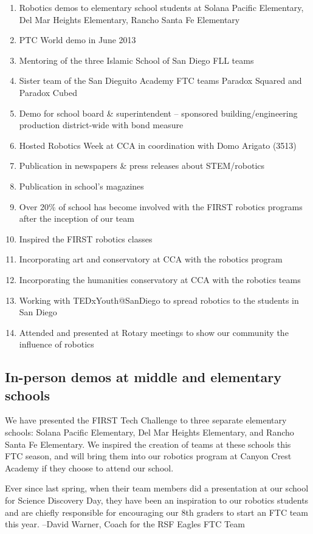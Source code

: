 \begin{enumerate}
	\item Robotics demos to elementary school students at Solana Pacific Elementary, Del Mar Heights Elementary, Rancho Santa Fe Elementary
	\item PTC World demo in June 2013
	\item Mentoring of the three Islamic School of San Diego FLL teams 
	\item Sister team of the San Dieguito Academy FTC teams Paradox Squared and Paradox Cubed
	\item Demo for school board \& superintendent – sponsored building/engineering production district-wide with bond measure
	\item Hosted Robotics Week at CCA in coordination with Domo Arigato (3513)
	\item Publication in newspapers \& press releases about STEM/robotics
	\item Publication in school's magazines
	\item Over 20\% of school has become involved with the FIRST robotics programs after the inception of our team
	\item Inspired the FIRST robotics classes
	\item Incorporating art and conservatory at CCA with the robotics program
	\item Incorporating the humanities conservatory at CCA with the robotics teams
	\item Working with TEDxYouth@SanDiego to spread robotics to the students in San Diego
	\item Attended and presented at Rotary meetings to show our community the influence of robotics
\end{enumerate}

\subsection{In-person demos at middle and elementary schools}

We have presented the FIRST Tech Challenge to three separate elementary schools: Solana Pacific Elementary, Del Mar Heights Elementary, and Rancho Santa Fe Elementary. We inspired the creation of teams at these schools this FTC season, and will bring them into our robotics program at Canyon Crest Academy if they choose to attend our school.

\begin{fancyquotes}
Ever since last spring, when their team members did a presentation at our school for Science Discovery Day, they have been an inspiration to our robotics students and are chiefly responsible for encouraging our 8th graders to start an FTC team this year. \newline \newline
--David Warner, Coach for the RSF Eagles FTC Team
\end{fancyquotes}

